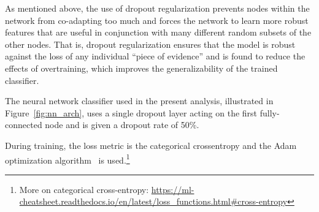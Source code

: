 \noindent
As mentioned above, the use of dropout regularization prevents nodes within the network from co-adapting
too much and forces the network to learn more robust features that are useful in conjunction with many 
different random subsets of the other nodes.
That is, dropout regularization ensures that the model is robust against the loss of any individual
``piece of evidence'' and is found to reduce the effects of overtraining, which improves the generalizability
of the trained classifier.

The neural network classifier used in the present analysis, illustrated in Figure~\ref{fig:nn_arch},
uses a single dropout layer acting on the first fully-connected node and is given a dropout rate of 50\%.

During training, the loss metric is the categorical crossentropy and the Adam optimization algorithm~\cite{AdamOptimizer} is used.\footnote{More
on categorical cross-entropy: \href{https://ml-cheatsheet.readthedocs.io/en/latest/loss_functions.html\#cross-entropy}
{https://ml-cheatsheet.readthedocs.io/en/latest/loss\_functions.html\#cross-entropy}}


%
%
